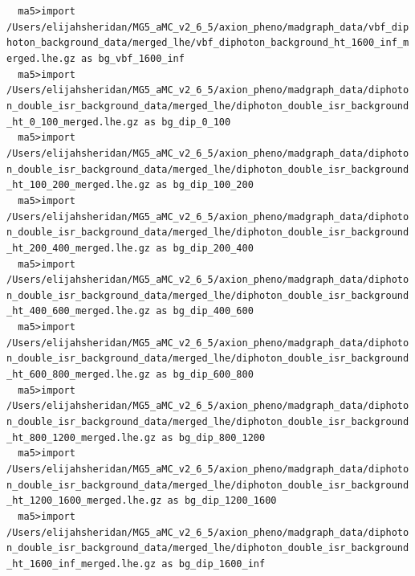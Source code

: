 \documentclass[a4paper, 10pt]{article}
\begin{document}
\texttt{ }\texttt{ }\texttt{ma5>import /\-Users/\-elijahsheridan/\-MG5\_aMC\_v2\_6\_5/\-axion\_pheno/\-madgraph\_data/\-vbf\_diphoton\_background\_data/\-merged\_lhe/\-vbf\_diphoton\_background\_ht\_1600\_inf\_merged.lhe.gz as bg\_vbf\_1600\_inf\\
}
\texttt{ }\texttt{ }\texttt{ma5>import /\-Users/\-elijahsheridan/\-MG5\_aMC\_v2\_6\_5/\-axion\_pheno/\-madgraph\_data/\-diphoton\_double\_isr\_background\_data/\-merged\_lhe/\-diphoton\_double\_isr\_background\_ht\_0\_100\_merged.lhe.gz as bg\_dip\_0\_100\\
}
\texttt{ }\texttt{ }\texttt{ma5>import /\-Users/\-elijahsheridan/\-MG5\_aMC\_v2\_6\_5/\-axion\_pheno/\-madgraph\_data/\-diphoton\_double\_isr\_background\_data/\-merged\_lhe/\-diphoton\_double\_isr\_background\_ht\_100\_200\_merged.lhe.gz as bg\_dip\_100\_200\\
}
\texttt{ }\texttt{ }\texttt{ma5>import /\-Users/\-elijahsheridan/\-MG5\_aMC\_v2\_6\_5/\-axion\_pheno/\-madgraph\_data/\-diphoton\_double\_isr\_background\_data/\-merged\_lhe/\-diphoton\_double\_isr\_background\_ht\_200\_400\_merged.lhe.gz as bg\_dip\_200\_400\\
}
\texttt{ }\texttt{ }\texttt{ma5>import /\-Users/\-elijahsheridan/\-MG5\_aMC\_v2\_6\_5/\-axion\_pheno/\-madgraph\_data/\-diphoton\_double\_isr\_background\_data/\-merged\_lhe/\-diphoton\_double\_isr\_background\_ht\_400\_600\_merged.lhe.gz as bg\_dip\_400\_600\\
}
\texttt{ }\texttt{ }\texttt{ma5>import /\-Users/\-elijahsheridan/\-MG5\_aMC\_v2\_6\_5/\-axion\_pheno/\-madgraph\_data/\-diphoton\_double\_isr\_background\_data/\-merged\_lhe/\-diphoton\_double\_isr\_background\_ht\_600\_800\_merged.lhe.gz as bg\_dip\_600\_800\\
}
\texttt{ }\texttt{ }\texttt{ma5>import /\-Users/\-elijahsheridan/\-MG5\_aMC\_v2\_6\_5/\-axion\_pheno/\-madgraph\_data/\-diphoton\_double\_isr\_background\_data/\-merged\_lhe/\-diphoton\_double\_isr\_background\_ht\_800\_1200\_merged.lhe.gz as bg\_dip\_800\_1200\\
}
\texttt{ }\texttt{ }\texttt{ma5>import /\-Users/\-elijahsheridan/\-MG5\_aMC\_v2\_6\_5/\-axion\_pheno/\-madgraph\_data/\-diphoton\_double\_isr\_background\_data/\-merged\_lhe/\-diphoton\_double\_isr\_background\_ht\_1200\_1600\_merged.lhe.gz as bg\_dip\_1200\_1600\\
}
\texttt{ }\texttt{ }\texttt{ma5>import /\-Users/\-elijahsheridan/\-MG5\_aMC\_v2\_6\_5/\-axion\_pheno/\-madgraph\_data/\-diphoton\_double\_isr\_background\_data/\-merged\_lhe/\-diphoton\_double\_isr\_background\_ht\_1600\_inf\_merged.lhe.gz as bg\_dip\_1600\_inf\\
}
\end{document}
